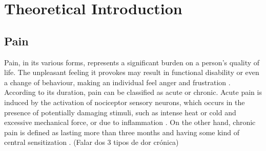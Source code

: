 \chapter{Theoretical Introduction}

\section{Pain}
Pain, in its various forms, represents a significant burden on a person's quality of life. The unpleasant feeling it provokes may result in functional disability or even a change of behaviour, making an individual feel anger and frustration \cite{Dirk2021}. According to its duration, pain can be classified as acute or chronic. Acute pain is induced by the activation of nociceptor sensory neurons, which occurs in the presence of potentially damaging stimuli, such as intense heat or cold and excessive mechanical force, or due to inflammation \cite{Jayakar2021}. On the other hand, chronic pain is defined as lasting more than three months and having some kind of central sensitization \cite{Raman2022}. (Falar dos 3 tipos de dor crónica)



